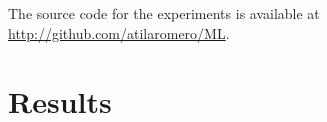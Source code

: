 The source code for the experiments is available at \url{http://github.com/atilaromero/ML}.

\section{Results}



% 








